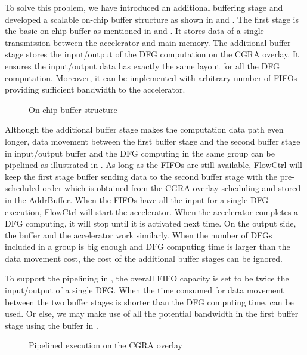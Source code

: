 To solve this problem, we have introduced an additional buffering stage and developed 
a scalable on-chip buffer structure as shown in  
and . The first stage is the basic on-chip buffer as 
mentioned in  and . It stores 
data of a single transmission between the accelerator and main memory. The additional 
buffer stage stores the input/output of the DFG computation on the CGRA overlay. It ensures the 
input/output data has exactly the same layout for all the DFG computation. Moreover, it can be 
implemented with arbitrary number of FIFOs providing sufficient bandwidth to the accelerator. 

\begin{figure}[tb]
    \centering
	\qquad
    \hfill
    \caption{On-chip buffer structure}
	\label{fig:on-chip-buffer}
\end{figure}


Although the additional buffer stage makes the computation data path even 
longer, data movement between the first buffer stage and the second buffer 
stage in input/output buffer and the DFG computing in the same group can 
be pipelined as illustrated in . 
As long as the FIFOs are still available, FlowCtrl will keep the 
first stage buffer sending data to the second buffer stage with the 
pre-scheduled order which is obtained from the CGRA overlay scheduling 
and stored in the AddrBuffer. When the FIFOs have all the input for a 
single DFG execution, FlowCtrl will start the accelerator. When the 
accelerator completes a DFG computing, it will stop until it is activated 
next time. On the output side, the buffer and the accelerator work similarly.
When the number of DFGs included in a group is big enough and DFG computing 
time is larger than the data movement cost, the cost of the 
additional buffer stages can be ignored. 

To support the pipelining in , 
the overall FIFO capacity is set to be twice the input/output 
of a single DFG. When the time consumed for data movement between 
the two buffer stages is shorter than the DFG computing time, 
 can be used. Or else, we may 
make use of all the potential bandwidth in the first buffer stage using 
the buffer in . 

\begin{figure}[tb]
\caption{Pipelined execution on the CGRA overlay}
\label{fig:buffer-pipelining}
\end{figure}


